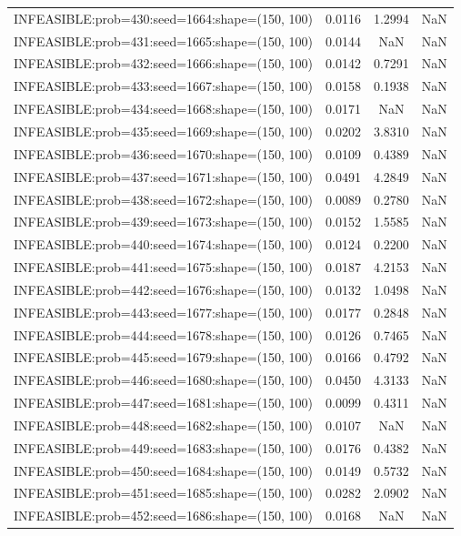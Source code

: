 \begin{longtable}{lccc}
INFEASIBLE:prob=430:seed=1664:shape=(150, 100) & 0.0116 &  1.2994 &    NaN \\
INFEASIBLE:prob=431:seed=1665:shape=(150, 100) & 0.0144 &     NaN &    NaN \\
INFEASIBLE:prob=432:seed=1666:shape=(150, 100) & 0.0142 &  0.7291 &    NaN \\
INFEASIBLE:prob=433:seed=1667:shape=(150, 100) & 0.0158 &  0.1938 &    NaN \\
INFEASIBLE:prob=434:seed=1668:shape=(150, 100) & 0.0171 &     NaN &    NaN \\
INFEASIBLE:prob=435:seed=1669:shape=(150, 100) & 0.0202 &  3.8310 &    NaN \\
INFEASIBLE:prob=436:seed=1670:shape=(150, 100) & 0.0109 &  0.4389 &    NaN \\
INFEASIBLE:prob=437:seed=1671:shape=(150, 100) & 0.0491 &  4.2849 &    NaN \\
INFEASIBLE:prob=438:seed=1672:shape=(150, 100) & 0.0089 &  0.2780 &    NaN \\
INFEASIBLE:prob=439:seed=1673:shape=(150, 100) & 0.0152 &  1.5585 &    NaN \\
INFEASIBLE:prob=440:seed=1674:shape=(150, 100) & 0.0124 &  0.2200 &    NaN \\
INFEASIBLE:prob=441:seed=1675:shape=(150, 100) & 0.0187 &  4.2153 &    NaN \\
INFEASIBLE:prob=442:seed=1676:shape=(150, 100) & 0.0132 &  1.0498 &    NaN \\
INFEASIBLE:prob=443:seed=1677:shape=(150, 100) & 0.0177 &  0.2848 &    NaN \\
INFEASIBLE:prob=444:seed=1678:shape=(150, 100) & 0.0126 &  0.7465 &    NaN \\
INFEASIBLE:prob=445:seed=1679:shape=(150, 100) & 0.0166 &  0.4792 &    NaN \\
INFEASIBLE:prob=446:seed=1680:shape=(150, 100) & 0.0450 &  4.3133 &    NaN \\
INFEASIBLE:prob=447:seed=1681:shape=(150, 100) & 0.0099 &  0.4311 &    NaN \\
INFEASIBLE:prob=448:seed=1682:shape=(150, 100) & 0.0107 &     NaN &    NaN \\
INFEASIBLE:prob=449:seed=1683:shape=(150, 100) & 0.0176 &  0.4382 &    NaN \\
INFEASIBLE:prob=450:seed=1684:shape=(150, 100) & 0.0149 &  0.5732 &    NaN \\
INFEASIBLE:prob=451:seed=1685:shape=(150, 100) & 0.0282 &  2.0902 &    NaN \\
INFEASIBLE:prob=452:seed=1686:shape=(150, 100) & 0.0168 &     NaN &    NaN \\

\end{longtable}
